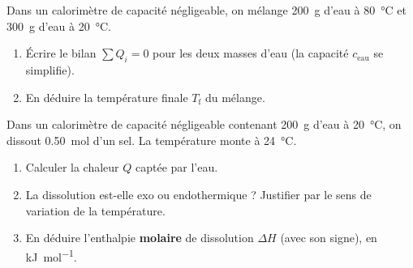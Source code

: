 \documentclass[11pt,a4paper]{article}
\begin{document}
\begin{exercice}
Dans un calorimètre de capacité négligeable, on mélange \SI{200}{\gram} d'eau à \SI{80}{\celsius} et
\SI{300}{\gram} d'eau à \SI{20}{\celsius}.
\begin{enumerate}[label=\alph*),leftmargin=2em,topsep=2pt,itemsep=2pt]
  \item Écrire le bilan $\sum Q_i = 0$ pour les deux masses d'eau (la capacité $c_{\text{eau}}$ se simplifie).
  \item En déduire la température finale $T_{\text{f}}$ du mélange.
\end{enumerate}
\end{exercice}

\begin{exercice}
Dans un calorimètre de capacité négligeable contenant \SI{200}{\gram} d'eau à \SI{20}{\celsius}, on
dissout \SI{0.50}{\mol} d'un sel. La température monte à \SI{24}{\celsius}.
\begin{enumerate}[label=\alph*),leftmargin=2em,topsep=2pt,itemsep=2pt]
  \item Calculer la chaleur $Q$ captée par l'eau.
  \item La dissolution est-elle exo ou endothermique ? Justifier par le sens de variation de la température.
  \item En déduire l'enthalpie \textbf{molaire} de dissolution $\Delta H$ (avec son signe), en \si{\kilo\joule\per\mol}.
\end{enumerate}
\end{exercice}
\end{document}
